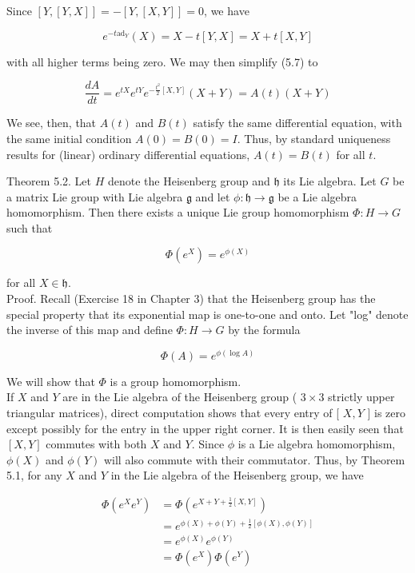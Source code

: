 \documentclass[10pt, letterpaper]{article}
\begin{document}
Since $[Y,[Y, X]]=-[Y,[X, Y]]=0$, we have

$$
e^{-t \mathrm{ad}_{Y}}(X)=X-t[Y, X]=X+t[X, Y]
$$

with all higher terms being zero. We may then simplify (5.7) to

$$
\frac{d A}{d t}=e^{t X} e^{t Y} e^{-\frac{t^{2}}{2}[X, Y]}(X+Y)=A(t)(X+Y)
$$

We see, then, that $A(t)$ and $B(t)$ satisfy the same differential equation, with the same initial condition $A(0)=B(0)=I$. Thus, by standard uniqueness results for (linear) ordinary differential equations, $A(t)=B(t)$ for all $t$.

Theorem 5.2. Let $H$ denote the Heisenberg group and $\mathfrak{h}$ its Lie algebra. Let $G$ be a matrix Lie group with Lie algebra $\mathfrak{g}$ and let $\phi: \mathfrak{h} \rightarrow \mathfrak{g}$ be a Lie algebra homomorphism. Then there exists a unique Lie group homomorphism $\Phi: H \rightarrow G$ such that

$$
\Phi\left(e^{X}\right)=e^{\phi(X)}
$$

for all $X \in \mathfrak{h}$.\\
Proof. Recall (Exercise 18 in Chapter 3) that the Heisenberg group has the special property that its exponential map is one-to-one and onto. Let "log" denote the inverse of this map and define $\Phi: H \rightarrow G$ by the formula

$$
\Phi(A)=e^{\phi(\log A)}
$$

We will show that $\Phi$ is a group homomorphism.\\
If $X$ and $Y$ are in the Lie algebra of the Heisenberg group ( $3 \times 3$ strictly upper triangular matrices), direct computation shows that every entry of [ $X, Y$ ] is zero except possibly for the entry in the upper right corner. It is then easily seen that $[X, Y]$ commutes with both $X$ and $Y$. Since $\phi$ is a Lie algebra homomorphism, $\phi(X)$ and $\phi(Y)$ will also commute with their commutator. Thus, by Theorem 5.1, for any $X$ and $Y$ in the Lie algebra of the Heisenberg group, we have

$$
\begin{aligned}
\Phi\left(e^{X} e^{Y}\right) & =\Phi\left(e^{X+Y+\frac{1}{2}[X, Y]}\right) \\
& =e^{\phi(X)+\phi(Y)+\frac{1}{2}[\phi(X), \phi(Y)]} \\
& =e^{\phi(X)} e^{\phi(Y)} \\
& =\Phi\left(e^{X}\right) \Phi\left(e^{Y}\right)
\end{aligned}
$$
\end{document}
